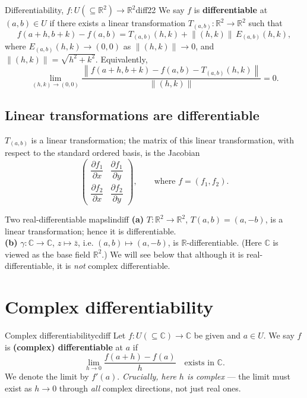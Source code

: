 \documentclass[11pt,openany]{report}
\newcommand{\C}{\mathbb{C}}
\newcommand{\R}{\mathbb{R}}
\newcommand{\norm}[1]{\left\lVert #1 \right\rVert}
\newcommand{\pd}[2]{\dfrac{\partial #1}{\partial #2}}
\begin{document}
\begin{definition}{Differentiability, $f:U(\subseteq\R^2)\to\R^2$}{diff22}
We say $f$ is \textbf{differentiable} at $(a,b)\in U$ if there exists a linear
transformation $T_{(a,b)}:\R^2\to\R^2$ such that
\[
  f(a+h,b+k) - f(a,b) = T_{(a,b)}(h,k) + \norm{(h,k)}\,E_{(a,b)}(h,k),
\]
where $E_{(a,b)}(h,k)\to(0,0)$ as $\norm{(h,k)}\to0$, and
$\norm{(h,k)}=\sqrt{h^2+k^2}$. Equivalently,
\[
  \lim_{(h,k)\to(0,0)} \frac{\norm{ f(a+h,b+k) - f(a,b) - T_{(a,b)}(h,k) }}{\norm{(h,k)}} = 0.
\]
\end{definition}

\subsection{Linear transformations are differentiable}

$T_{(a,b)}$ is a linear transformation; the matrix of this linear transformation, with
respect to the standard ordered basis, is the Jacobian
\[
  \begin{pmatrix}
    \pd{f_1}{x} & \pd{f_1}{y} \\[8pt]
    \pd{f_2}{x} & \pd{f_2}{y}
  \end{pmatrix},
  \qquad\text{where } f=(f_1,f_2).
\]

\begin{example}{Two real-differentiable maps}{lindiff}
\textbf{(a)} $T:\R^2\to\R^2$, $T(a,b)=(a,-b)$, is a linear transformation; hence it is
differentiable.\\[2pt]
\textbf{(b)} $\gamma:\C\to\C$, $z\mapsto\bar z$, i.e. $(a,b)\mapsto(a,-b)$, is
$\R$-differentiable. (Here $\C$ is viewed as the base field $\R^2$.) We will see below
that although it is real-differentiable, it is \emph{not} complex differentiable.
\end{example}

\section{Complex differentiability}

\begin{definition}{Complex differentiability}{cdiff}
Let $f:U(\subseteq\C)\to\C$ be given and $a\in U$. We say $f$ is \textbf{(complex)
differentiable} at $a$ if
\[
  \lim_{h\to0} \frac{f(a+h)-f(a)}{h} \quad\text{exists in } \C.
\]
We denote the limit by $f'(a)$. \emph{Crucially, here $h$ is complex} --- the limit must
exist as $h\to0$ through \emph{all} complex directions, not just real ones.
\end{definition}
\end{document}

